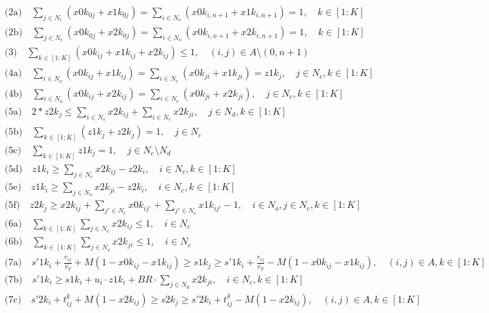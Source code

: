 \documentclass[10pt]{article}
\begin{document}
\begin{align*}
&\text{(2a)} \quad \sum_{j \in N_e} (x0k_{0j} + x1k_{0j}) = \sum_{i \in N_o} (x0k_{i,n+1} + x1k_{i,n+1}) = 1, \quad k \in [1 : K] \\
&\text{(2b)} \quad \sum_{j \in N_e} (x0k_{0j} + x2k_{0j}) = \sum_{i \in N_o} (x0k_{i,n+1} + x2k_{i,n+1}) = 1, \quad k \in [1 : K] \\
&\text{(3)} \quad \sum_{k \in [1:K]} (x0k_{ij} + x1k_{ij} + x2k_{ij}) \leq 1, \quad (i, j) \in A \setminus (0, n + 1) \\
&\text{(4a)} \quad \sum_{i \in N_o} (x0k_{ij} + x1k_{ij}) = \sum_{i \in N_e} (x0k_{ji} + x1k_{ji}) = z1k_j, \quad j \in N_c, k \in [1 : K] \\
&\text{(4b)} \quad \sum_{i \in N_o} (x0k_{ij} + x2k_{ij}) = \sum_{i \in N_e} (x0k_{ji} + x2k_{ji}), \quad j \in N_c, k \in [1 : K] \\
&\text{(5a)} \quad 2 * z2k_j \leq \sum_{i \in N_o} x2k_{ij} + \sum_{i \in N_e} x2k_{ji}, \quad j \in N_d, k \in [1 : K] \\
&\text{(5b)} \quad \sum_{k \in [1:K]} (z1k_j + z2k_j) = 1, \quad j \in N_c \\
&\text{(5c)} \quad \sum_{k \in [1:K]} z1k_j = 1, \quad j \in N_c\setminus N_d \\
&\text{(5d)} \quad z1k_i \geq \sum_{j \in N_e} x2k_{ij} - z2k_i, \quad i \in N_c, k \in [1 : K] \\
&\text{(5e)} \quad z1k_i \geq \sum_{j \in N_o} x2k_{ji} - z2k_i, \quad i \in N_c, k \in [1 : K] \\
&\text{(5f)} \quad z2k_j \geq x2k_{ij} + \sum_{j' \in N_e} x0k_{ij'} + \sum_{j' \in N_e} x1k_{ij'} - 1, \quad i \in N_o, j \in N_c, k \in [1 : K] \\
&\text{(6a)} \quad \sum_{k \in [1:K]} \sum_{j \in N_e} x2k_{ij} \leq 1, \quad i \in N_c \\
&\text{(6b)} \quad \sum_{k \in [1:K]} \sum_{j \in N_o} x2k_{ji} \leq 1, \quad i \in N_c \\
&\text{(7a)} \quad s'1k_i + \frac{r_{ij}}{v_T} + M(1 - x0k_{ij} - x1k_{ij}) \geq s1k_j \geq s'1k_i + \frac{r_{ij}}{v_T} - M(1 - x0k_{ij} - x1k_{ij}), \quad (i, j) \in A, k \in [1 : K] \\
&\text{(7b)} \quad s'1k_i \geq s1k_i + u_i \cdot z1k_i + BR \cdot \sum_{j \in N_d} x2k_{ji}, \quad i \in N_c, k \in [1 : K] \\
&\text{(7c)} \quad s'2k_i + t^k_{ij} + M(1 - x2k_{ij}) \geq s2k_j \geq s'2k_i + t^k_{ij} - M(1 - x2k_{ij}), \quad (i, j) \in A, k \in [1 : K] \\

\end{align*}
\end{document}

